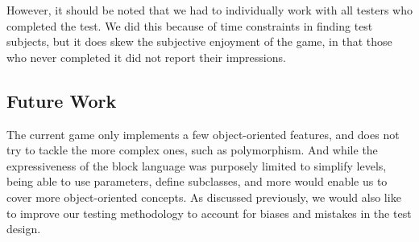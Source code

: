 \documentclass[12pt,notitlepage]{article}
\begin{document}
However, it should be noted that we had to individually work with all
testers who completed the test. We did this because of time
constraints in finding test subjects, but it does skew the subjective
enjoyment of the game, in that those who never completed it did not
report their impressions.

\subsection{Future Work}

The current game only implements a few object-oriented features, and
does not try to tackle the more complex ones, such as
polymorphism. And while the expressiveness of the block language was
purposely limited to simplify levels, being able to use parameters,
define subclasses, and more would enable us to cover more
object-oriented concepts. As discussed previously, we would also like
to improve our testing methodology to account for biases and mistakes
in the test design.
\end{document}
